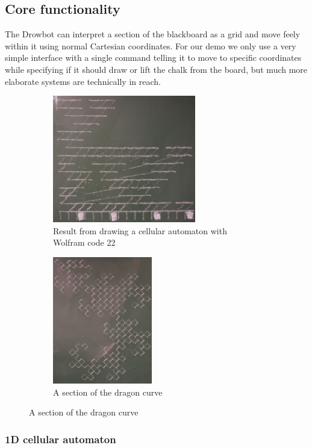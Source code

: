 \documentclass[12pt]{article}
\begin{document}
\subsection{Core functionality}
The Drowbot can interpret a section of the blackboard as a grid
and move feely within it using normal Cartesian coordinates.
For our demo we only use a very simple interface with a single
command telling it to move to specific coordinates while specifying
if it should draw or lift the chalk from the board, but much more
elaborate systems are technically in reach.

\begin{figure}
  \centering
  \begin{subfigure}[t]{0.55\textwidth}
    \centering
    \includegraphics[height=15em]{img/ca_res.jpg}
    \caption{Result from drawing a cellular automaton with Wolfram code 22}
    \label{fig:ca_res}
  \end{subfigure}
  \begin{subfigure}[t]{0.4\textwidth}
    \centering
    \includegraphics[height=15em]{img/dragon_curve.jpg}
    \caption{A section of the dragon curve}
    \label{fig:drag_curve}
  \end{subfigure}
\end{figure}

\subsubsection*{1D cellular automaton}
\end{document}
